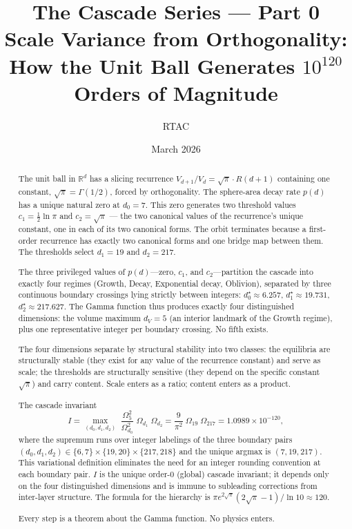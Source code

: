 \documentclass[11pt,a4paper]{article}
\title{The Cascade Series --- Part 0\\[0.5em]
\large Scale Variance from Orthogonality:\\
How the Unit Ball Generates $10^{120}$ Orders of Magnitude}
\author{RTAC}
\date{March 2026}
\begin{document}
\setlength{\emergencystretch}{3em}
\maketitle
{}
\label{paperdoc}

\begin{abstract}
The unit ball in $\mathbb{R}^d$ has a slicing recurrence
$V_{d+1}/V_d = \sqrt{\pi}\cdot R(d+1)$ containing one constant,
$\sqrt{\pi} = \Gamma(1/2)$, forced by orthogonality. The sphere-area decay
rate $p(d)$ has a unique natural zero at $d_0 = 7$. This zero generates
two threshold values $c_1 = \tfrac{1}{2}\ln\pi$ and $c_2 = \sqrt{\pi}$ ---
the two canonical values of the recurrence's unique constant, one in each
of its two canonical forms. The orbit terminates because a first-order
recurrence has exactly two canonical forms and one bridge map between them.
The thresholds select $d_1 = 19$ and $d_2 = 217$.

The three privileged values of $p(d)$---zero, $c_1$, and $c_2$---partition
the cascade into exactly four regimes (Growth, Decay, Exponential decay,
Oblivion), separated by three continuous boundary crossings lying strictly
between integers: $d_0^\star\approx 6.257$, $d_1^\star\approx 19.731$,
$d_2^\star\approx 217.627$. The Gamma function thus produces exactly four
distinguished dimensions: the volume maximum $d_V = 5$ (an interior
landmark of the Growth regime), plus one representative integer per
boundary crossing. No fifth exists.

The four dimensions separate by structural stability into two classes:
the equilibria are structurally stable (they exist for any value of the
recurrence constant) and serve as scale; the thresholds are structurally
sensitive (they depend on the specific constant $\sqrt{\pi}$) and carry
content. Scale enters as a ratio; content enters as a product.

The cascade invariant
\[
I = \max_{(d_0,d_1,d_2)}\;\frac{\Omega_5^2}{\Omega_{d_0}^2}\;\Omega_{d_1}\;\Omega_{d_2}
= \frac{9}{\pi^2}\;\Omega_{19}\;\Omega_{217}
= 1.0989\times 10^{-120},
\]
where the supremum runs over integer labelings of the three boundary pairs
$(d_0,d_1,d_2) \in \{6,7\}\times\{19,20\}\times\{217,218\}$ and the unique
argmax is $(7, 19, 217)$. This variational definition eliminates the need
for an integer rounding convention at each boundary pair. $I$ is the
unique order-0 (global) cascade invariant; it depends only on the four
distinguished dimensions and is immune to subleading corrections from
inter-layer structure. The formula for the hierarchy
is $\pi e^{2\sqrt{\pi}}(2\sqrt{\pi}-1)/\ln 10\approx 120$.

Every step is a theorem about the Gamma function. No physics enters.
\end{abstract}
\end{document}
